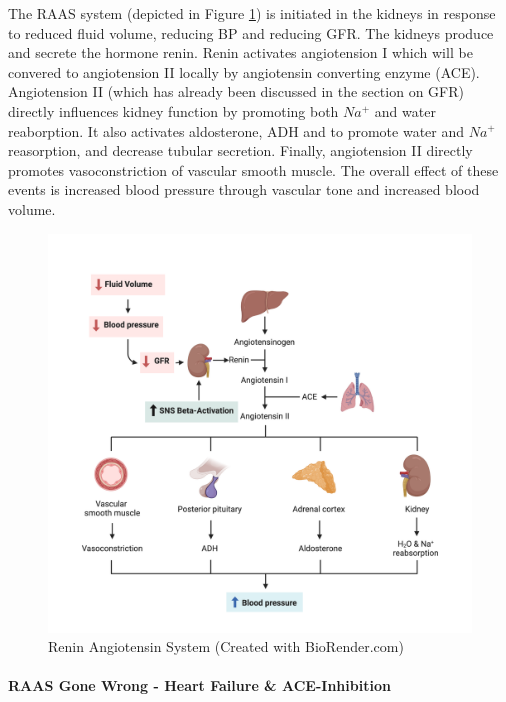 The RAAS system (depicted in Figure \ref{fig:raas}) is initiated in the kidneys in response to reduced fluid volume, reducing BP and reducing GFR. The kidneys produce and secrete the hormone renin. Renin activates angiotension I which will be convered to angiotension II locally by angiotensin converting enzyme (ACE). Angiotension II (which has already been discussed in the section on GFR) directly influences kidney function by promoting both $Na^+$ and water reaborption. It also activates aldosterone, ADH and to promote water and $Na^+$ reasorption, and decrease tubular secretion. Finally, angiotension II directly promotes vasoconstriction of vascular smooth muscle. The overall effect of these events is increased blood pressure through vascular tone and increased blood volume.

\begin{figure}[!h]
    \centering
    \includegraphics[width=1\linewidth]{./figure/raas.png}
    \caption{Renin Angiotensin System \footnotesize{(Created with BioRender.com)}}
    \label{fig:raas}
\end{figure}

\paragraph{RAAS Gone Wrong - Heart Failure \& ACE-Inhibition}

